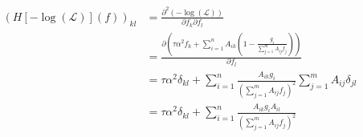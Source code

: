 \begin{align}
    \left(H[-\log\left(\mathcal{L}\right)]\left(f\right)\right)_{kl} &= \frac{\partial^2 \left(-\log\left(\mathcal{L}\right)\right)}{\partial f_k \partial f_l}\nonumber\\
                                    &= \frac{\partial \left(\tau \alpha^2 f_k + \sum_{i=1}^n A_{ik} \left(1-\frac{g_i}{\sum_{j=1}^m A_{ij}f_j}\right)\right)}{\partial f_l}\nonumber\\
                                    &= \tau \alpha^2 \delta_{kl} + \sum_{i=1}^n \frac{A_{ik}g_i}{\left(\sum_{j=1}^m A_{ij}f_j\right)^2}\sum_{j=1}^m A_{ij}\delta_{jl}\nonumber\\
                                    &= \tau \alpha^2 \delta_{kl} + \sum_{i=1}^n \frac{A_{ik}g_iA_{il}}{\left(\sum_{j=1}^m A_{ij}f_j\right)^2}
\end{align}
